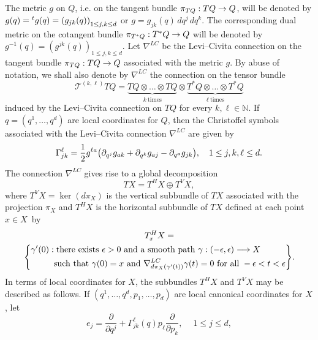 \documentclass[AHL,Unicode,longabstracts]{cedram}
\newcommand{\N}{\mathbb{N}}
\newcommand{\clT}{\mathcal{T}}
\newcommand{\p}{\partial}
\let\originalleft\left
\let\originalright\right
\renewcommand{\left}{\mathopen{}\mathclose\bgroup\originalleft}
\renewcommand{\right}{\aftergroup\egroup\originalright}
\renewcommand*{\to}{\mathchoice{\longrightarrow}{\rightarrow}{\rightarrow}{\rightarrow}}
\begin{document}
The metric $g$ on $Q$, i.e. on the tangent bundle $\pi_{TQ}: TQ \to Q$, will be denoted by $g(q) = {}^{t}g(q) = \left(g_{jk}(q) \right)_{1 \le j, k \le d}$ or $g = g_{jk}(q) \, dq^j \, dq^k$. The corresponding dual metric on the cotangent bundle $\pi_{T^* Q}: T^* Q \to Q$ will be denoted by $g^{-1}(q) = (g^{jk}(q))_{1 \le j, k \le d}$. Let $\nabla^{LC}$ be the Levi--Civita connection on the tangent bundle $\pi_{TQ}: TQ \to Q$ associated with the metric $g$. By abuse of notation, we shall also denote by $\nabla^{LC}$ the connection on the tensor bundle
\begin{equation}
\clT^{(k,\ell)} TQ = \underbrace{TQ \otimes \dots \otimes TQ}_{k \ \text{times}} \otimes \underbrace{T^* Q \otimes \dots \otimes T^* Q}_{\ell \ \text{times}}
\end{equation}
induced by the Levi--Civita connection on $TQ$ for every $k, \ell \in \N$. If $q = (q^1, \dots, q^d)$ are local coordinates for $Q$, then the Christoffel symbols associated with the Levi--Civita connection $\nabla^{LC}$ are given by
\begin{equation}
\Gamma_{jk}^\ell = \frac{1}{2} g^{\ell a} \left(\p_{q^j} g_{a k} + \p_{q^k} g_{a j} - \p_{q^a} g_{jk} \right), \quad 1 \le j, k, \ell \le d.
\end{equation}
The connection $\nabla^{LC}$ gives rise to a global decomposition
\begin{equation}\label{horizontal_vertical_decomposition}
TX = T^H X \oplus T^V X,
\end{equation}
where $T^V X = \ker{(d\pi_X)}$ is the vertical subbundle of $TX$ associated with the projection $\pi_X$ and $T^H X$ is the horizontal subbundle of $TX$ defined at each point $x \in X$~by
\begin{multline}
T^H_x X =\\
\left\{
\begin{aligned}
\gamma'(0): & \; \text{there exists } \epsilon>0\text{ and a smooth path } \gamma: (-\epsilon, \epsilon) \to X  \\
& \text{such that }\gamma(0) = x\text{ and }\nabla^{LC}_{d\pi_X(\gamma'(t))} \gamma(t) = 0\text{ for all }-\epsilon<t<\epsilon
\end{aligned}
\right\}.
\end{multline}
In terms of local coordinates for $X$, the subbundles $T^HX$ and $T^V X$ may be described as follows. If $(q^1, \dots, q^d, p_1, \dots, p_d)$ are local canonical coordinates for $X$, let
\begin{equation}\label{definition_e_j}
e_j = \frac{\p}{\p q^j} + \Gamma^\ell_{jk}(q) p_\ell \frac{\p}{\p p_k}, \quad \ 1 \le j \le d,
\end{equation}
\end{document}
